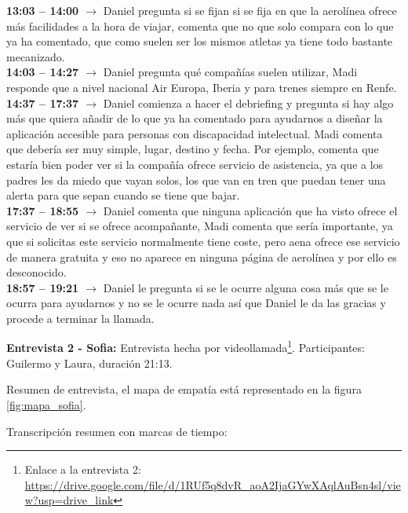 \textbf{13:03 -- 14:00 $\rightarrow$} Daniel pregunta si se fijan si se fija en que la aerolínea ofrece más facilidades a la hora de viajar, comenta que no que solo compara con lo que ya ha comentado, que como suelen ser los mismos atletas ya tiene todo bastante mecanizado. \\
\textbf{14:03 -- 14:27 $\rightarrow$} Daniel pregunta qué compañías suelen utilizar, Madi responde que a nivel nacional Air Europa, Iberia y para trenes siempre en Renfe. \\
\textbf{14:37 -- 17:37 $\rightarrow$} Daniel comienza a hacer el debriefing y pregunta si hay algo más que quiera añadir de lo que ya ha comentado para ayudarnos a diseñar la aplicación accesible para personas con discapacidad intelectual. Madi comenta que debería ser muy simple, lugar, destino y fecha. Por ejemplo, comenta que estaría bien poder ver si la compañía ofrece servicio de asistencia, ya que a los padres les da miedo que vayan solos, los que van en tren que puedan tener una alerta para que sepan cuando se tiene que bajar. \\
\textbf{17:37 -- 18:55 $\rightarrow$} Daniel comenta que ninguna aplicación que ha visto ofrece el servicio de ver si se ofrece acompañante, Madi comenta que sería importante, ya que si solicitas este servicio normalmente tiene coste, pero aena ofrece ese servicio de manera gratuita y eso no aparece en ninguna página de aerolínea y por ello es desconocido. \\
\textbf{18:57 -- 19:21 $\rightarrow$} Daniel le pregunta si se le ocurre alguna cosa más que se le ocurra para ayudarnos y no se le ocurre nada así que Daniel le da las gracias y procede a terminar la llamada.


\textbf{Entrevista 2 - Sofia:} Entrevista hecha por videollamada\footnote{Enlace a la entrevista 2: \url{https://drive.google.com/file/d/1RUf5q8dvR_aoA2IjaGYwXAqlAuBsn4sl/view?usp=drive_link}}. Participantes: Guilermo y Laura, duración 21:13.

Resumen de entrevista, el mapa de empatía está representado en la figura \ref{fig:mapa_sofia}.



Transcripción resumen con marcas de tiempo:

